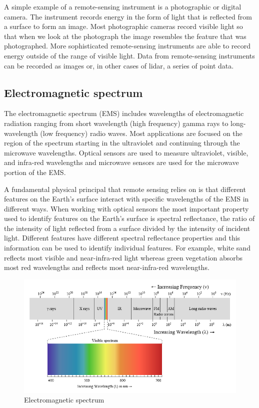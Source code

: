 A simple example of a remote-sensing instrument is a photographic or digital camera.
The instrument records energy in the form of light that is reflected from a surface to form an image.
Most photographic cameras record visible light so that when we look at the photograph the image resembles the feature that was photographed.
More sophisticated remote-sensing instruments are able to record energy outside of the range of visible light.
Data from remote-sensing instruments can be recorded as images or, in other cases of lidar, a series of point data.

    \subsection{Electromagnetic spectrum}

    The electromagnetic spectrum (EMS) includes wavelengths of electromagnetic radiation ranging from short wavelength (high frequency) gamma rays to long-wavelength (low frequency) radio waves. 
    Most applications are focused on the region of the spectrum starting in the ultraviolet and continuing through the microwave wavelengths. 
    Optical sensors are used to measure ultraviolet, visible, and infra-red wavelengths and microwave sensors are used for the microwave portion of the EMS.
    
    A fundamental physical principal that remote sensing relies on is that different features on the Earth's surface interact with specific wavelengths of the EMS in different ways.
    When working with optical sensors the most important property used to identify features on the Earth's surface is spectral reflectance, the ratio of the intensity of light reflected from a surface divided by the intensity of incident light.
    Different features have different spectral reflectance properties and this information can be used to identify individual features.
    For example, white sand reflects most visible and near-infra-red light whereas green vegetation absorbs most red wavelengths and reflects most near-infra-red wavelengths.    

    \begin{figure}[H]
        \centering
        \includegraphics[width=\textwidth]{Includes/1-electromagnetic-spectrum.png}
        \caption{Electromagnetic spectrum}
        \label{fig:1-electromagnetic-spectrum}
    \end{figure}

